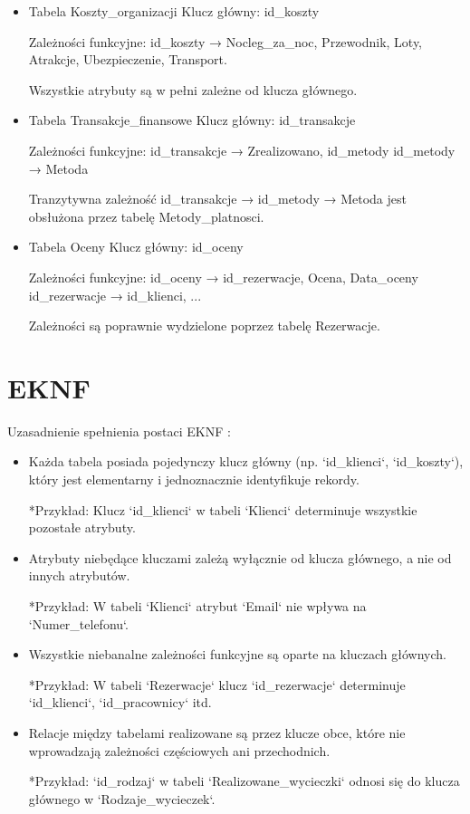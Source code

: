 \documentclass{article}
\theoremstyle{definition}
\begin{document}
\begin{itemize}
	\item Tabela Koszty\_organizacji
	Klucz główny: id\_koszty
	
	Zależności funkcyjne:
	id\_koszty → {Nocleg\_za\_noc, Przewodnik, Loty, Atrakcje, Ubezpieczenie, Transport}.
	
	Wszystkie atrybuty są w pełni zależne od klucza głównego.
	
	\item Tabela Transakcje\_finansowe
	Klucz główny: id\_transakcje
	
	Zależności funkcyjne:
	id\_transakcje → {Zrealizowano, id\_metody}
	id\_metody → Metoda 
	
	Tranzytywna zależność id\_transakcje → id\_metody → Metoda jest obsłużona przez tabelę Metody\_platnosci.
	
	\item Tabela Oceny
	Klucz główny: id\_oceny
	
	Zależności funkcyjne:
	id\_oceny → {id\_rezerwacje, Ocena, Data\_oceny}
	id\_rezerwacje → {id\_klienci, ...}
	
	Zależności są poprawnie wydzielone poprzez tabelę Rezerwacje.
	
	\end{itemize}

	\section{EKNF}
	Uzasadnienie spełnienia postaci EKNF :
	\begin{itemize}
	
	\item  Każda tabela posiada pojedynczy klucz główny (np. `id\_klienci`, `id\_koszty`), który jest elementarny i jednoznacznie identyfikuje rekordy. 
	 
	*Przykład: Klucz `id\_klienci` w tabeli `Klienci` determinuje wszystkie pozostałe atrybuty.
	
	\item  Atrybuty niebędące kluczami zależą wyłącznie od klucza głównego, a nie od innych atrybutów.  
	
	*Przykład: W tabeli `Klienci` atrybut `Email` nie wpływa na `Numer\_telefonu`.
	
	\item  Wszystkie niebanalne zależności funkcyjne są oparte na kluczach głównych.  
	
	*Przykład: W tabeli `Rezerwacje` klucz `id\_rezerwacje` determinuje `id\_klienci`, `id\_pracownicy` itd.
	
	\item  Relacje między tabelami realizowane są przez klucze obce, które nie wprowadzają zależności częściowych ani przechodnich.  
	
	*Przykład: `id\_rodzaj` w tabeli `Realizowane\_wycieczki` odnosi się do klucza głównego w `Rodzaje\_wycieczek`.
	
	\end{itemize}
\end{document}
